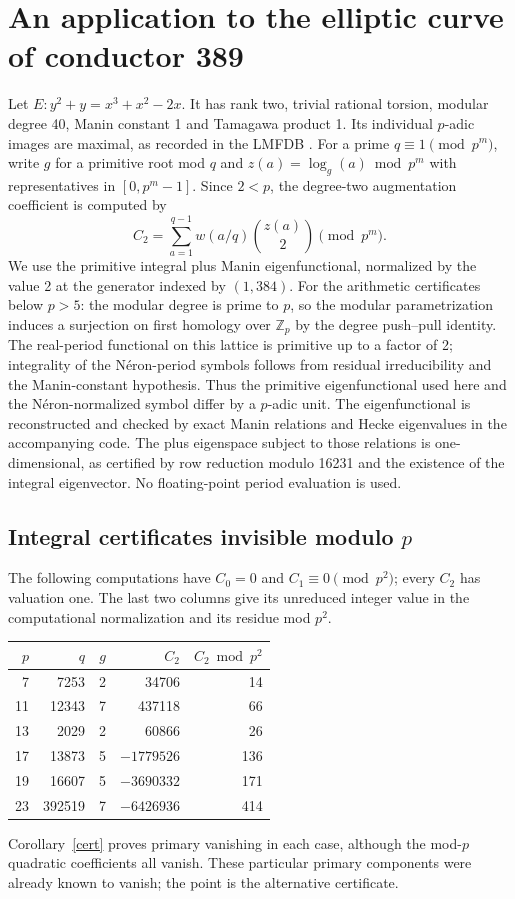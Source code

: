 \documentclass[11pt]{article}
\theoremstyle{remark}\newtheorem{remark}[theorem]{Remark}
\newcommand{\Z}{\mathbb Z}\newcommand{\Q}{\mathbb Q}\newcommand{\F}{\mathbb F}
\begin{document}
\section{An application to the elliptic curve of conductor 389}
Let $E:y^2+y=x^3+x^2-2x$. It has rank two, trivial rational torsion, modular degree 40, Manin constant 1 and Tamagawa product 1. Its individual $p$-adic images are maximal, as recorded in the LMFDB \cite{LMFDB}. For a prime $q\equiv1\pmod{p^m}$, write $g$ for a primitive root mod $q$ and $z(a)=\log_g(a)\bmod p^m$ with representatives in $[0,p^m-1]$. Since $2<p$, the degree-two augmentation coefficient is computed by
\begin{equation}
 C_2=\sum_{a=1}^{q-1} w(a/q)\binom{z(a)}{2}\pmod{p^m}.\label{calc}
\end{equation}
We use the primitive integral plus Manin eigenfunctional, normalized by the value 2 at the generator indexed by $(1,384)$. For the arithmetic certificates below $p>5$: the modular degree is prime to $p$, so the modular parametrization induces a surjection on first homology over $\Z_p$ by the degree push--pull identity. The real-period functional on this lattice is primitive up to a factor of 2; integrality of the N\'eron-period symbols follows from residual irreducibility and the Manin-constant hypothesis. Thus the primitive eigenfunctional used here and the N\'eron-normalized symbol differ by a $p$-adic unit. The eigenfunctional is reconstructed and checked by exact Manin relations and Hecke eigenvalues in the accompanying code. The plus eigenspace subject to those relations is one-dimensional, as certified by row reduction modulo 16231 and the existence of the integral eigenvector. No floating-point period evaluation is used.

\subsection{Integral certificates invisible modulo $p$}
The following computations have $C_0=0$ and $C_1\equiv0\pmod{p^2}$; every $C_2$ has valuation one. The last two columns give its unreduced integer value in the computational normalization and its residue mod $p^2$.
\begin{center}
\begin{tabular}{rrrrr}
\toprule
$p$ & $q$ & $g$ & $C_2$ & $C_2\bmod p^2$\\ \midrule
7&7253&2&34706&14\\
11&12343&7&437118&66\\
13&2029&2&60866&26\\
17&13873&5&$-1779526$&136\\
19&16607&5&$-3690332$&171\\
23&392519&7&$-6426936$&414\\
\bottomrule
\end{tabular}
\end{center}
Corollary~\ref{cert} proves primary vanishing in each case, although the mod-$p$ quadratic coefficients all vanish. These particular primary components were already known to vanish; the point is the alternative certificate.
\end{document}
